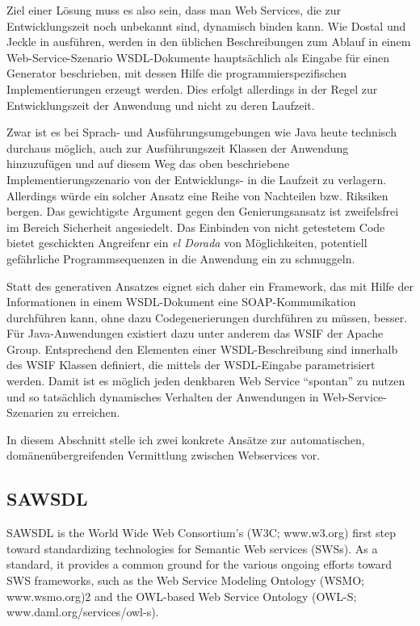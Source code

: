 Ziel einer Lösung muss es also sein, dass man Web Services, die zur Entwicklungszeit noch unbekannt sind, dynamisch binden kann. Wie Dostal und Jeckle in \cite[S.61]{xmlspek4} ausführen, werden in den üblichen Beschreibungen zum Ablauf in einem Web-Service-Szenario \ac{WSDL}-Dokumente hauptsächlich als Eingabe für einen Generator beschrieben, mit dessen Hilfe die programmierspezifischen Implementierungen erzeugt werden. Dies erfolgt allerdings in der Regel zur Entwicklungszeit der Anwendung und nicht zu deren Laufzeit.

Zwar ist es bei Sprach- und Ausführungsumgebungen wie Java heute technisch durchaus möglich, auch zur Ausführungszeit Klassen der Anwendung hinzuzufügen und auf diesem Weg das oben beschriebene Implementierungszenario von der Entwicklungs- in die Laufzeit zu verlagern. Allerdings würde ein solcher Ansatz eine Reihe von Nachteilen bzw. Riksiken bergen. Das gewichtigste Argument gegen den Genierungsansatz ist zweifelsfrei im Bereich Sicherheit angesiedelt. Das Einbinden von nicht getestetem Code bietet geschickten Angreifenr ein \emph{el Dorada} von Möglichkeiten, potentiell gefährliche Programmsequenzen in die Anwendung ein zu schmuggeln.

Statt des generativen Ansatzes eignet sich daher ein Framework, das mit Hilfe der Informationen in einem \ac{WSDL}-Dokument eine \ac{SOAP}-Kommunikation durchführen kann, ohne dazu Codegenerierungen durchführen zu müssen, besser. Für Java-Anwendungen existiert dazu unter anderem das \ac{WSIF} der Apache Group. Entsprechend den Elementen einer WSDL-Beschreibung sind innerhalb des \ac{WSIF} Klassen definiert, die mittels der \ac{WSDL}-Eingabe parametrisiert werden. Damit ist es möglich jeden denkbaren Web Service "`spontan"' zu nutzen und so tatsächlich dynamisches Verhalten der Anwendungen in Web-Service-Szenarien zu erreichen.



In diesem Abschnitt stelle ich zwei konkrete Ansätze zur automatischen, domänenübergreifenden Vermittlung zwischen Webservices vor.

\subsection{SAWSDL}

SAWSDL is the World Wide Web Consortium’s
(W3C; www.w3.org) first step toward standardizing
technologies for Semantic Web services
(SWSs). As a standard, it provides a common
ground for the various ongoing efforts
toward SWS frameworks, such as the
Web Service Modeling Ontology
(WSMO; www.wsmo.org)2 and the
OWL-based Web Service Ontology
(OWL-S; www.daml.org/services/owl-s).\cite[S.60]{ky-sawsdl}

